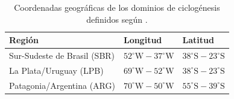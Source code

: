\begin{table}[ht]
\centering
\caption[Coordenadas de los dominios de ciclogénesis]{Coordenadas geográficas de los dominios de ciclogénesis definidos según \citet{gramcianinov2019properties}.}
\label{tab:regiones_coords}
\begin{tabular*}{\textwidth}{@{\extracolsep{\fill}}lll}
\hline
Región & Longitud & Latitud \\ 
\hline
Sur-Sudeste de Brasil (SBR) & $52^\circ\text{W} - 37^\circ\text{W}$ & $38^\circ\text{S} - 23^\circ\text{S}$ \\
La Plata/Uruguay (LPB) & $69^\circ\text{W} - 52^\circ\text{W}$ & $38^\circ\text{S} - 23^\circ\text{S}$ \\
Patagonia/Argentina (ARG) & $70^\circ\text{W} - 50^\circ\text{W}$ & $55^\circ\text{S} - 39^\circ\text{S}$ \\ 
\hline
\end{tabular*}
\end{table}


